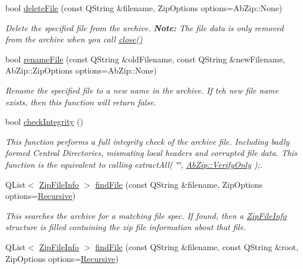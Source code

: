 \begin{DoxyCompactItemize}
bool \hyperlink{class_ab_zip_aba2e10727c9b7267e384e4e26ba63cbc}{delete\+File} (const Q\+String \&filename, Zip\+Options options=Ab\+Zip\+::\+None)
\begin{DoxyCompactList}\small\item\em Delete the specified file from the archive. {\bfseries Note\+:} The file data is only removed from the archive when you call \hyperlink{class_ab_zip_a8a68479ea9a9b4ba18064eb4f011af83}{close()} \end{DoxyCompactList}\item 
bool \hyperlink{class_ab_zip_a6e40593befbfd07151bfd89ee1fbc731}{rename\+File} (const Q\+String \&old\+Filename, const Q\+String \&new\+Filename, Ab\+Zip\+::\+Zip\+Options options=Ab\+Zip\+::\+None)
\begin{DoxyCompactList}\small\item\em Rename the specified file to a new name in the archive. If teh new file name exists, then this function will return {\ttfamily false}. \end{DoxyCompactList}\item 
bool \hyperlink{class_ab_zip_a783167f4c5f87551d7e2dc54b2beea3f}{check\+Integrity} ()
\begin{DoxyCompactList}\small\item\em This function performs a full integrity check of the archive file. Including badly formed Central Directories, mismating local headers and corrupted file data. This function is the equivalent to calling extract\+All( \char`\"{}\char`\"{}, \hyperlink{class_ab_zip_a9c4f57d6b8d9a449c2eb6c4d4e53c9d5aecc21ef1487642e3109d04d1a195010a}{Ab\+Zip\+::\+Verify\+Only} );. \end{DoxyCompactList}\item 
Q\+List$<$ \hyperlink{class_zip_file_info}{Zip\+File\+Info} $>$ \hyperlink{class_ab_zip_a0ac7b0fe63df09a394d7c3bdb5568c1b}{find\+File} (const Q\+String \&filename, Zip\+Options options=\hyperlink{class_ab_zip_a9c4f57d6b8d9a449c2eb6c4d4e53c9d5a23555db8b40ecaf3966a205023b515e3}{Recursive})
\begin{DoxyCompactList}\small\item\em This searches the archive for a matching file spec. If found, then a \hyperlink{class_zip_file_info}{Zip\+File\+Info} structure is filled containing the zip file information about that file. \end{DoxyCompactList}\item 
Q\+List$<$ \hyperlink{class_zip_file_info}{Zip\+File\+Info} $>$ \hyperlink{class_ab_zip_a3a60562106d519e49173bb0fdc42808f}{find\+File} (const Q\+String \&filename, const Q\+String \&root, Zip\+Options options=\hyperlink{class_ab_zip_a9c4f57d6b8d9a449c2eb6c4d4e53c9d5a23555db8b40ecaf3966a205023b515e3}{Recursive})

\end{DoxyCompactItemize}
